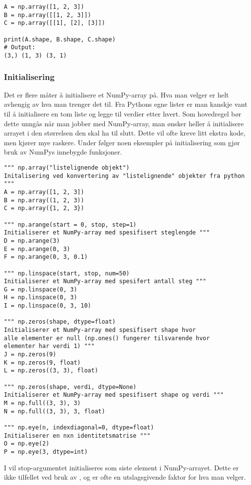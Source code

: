 \documentclass[a4paper,12pt]{article}
\begin{document}
\begin{lstlisting}
A = np.array([1, 2, 3])
B = np.array([[1, 2, 3]])
C = np.array([[1], [2], [3]])

print(A.shape, B.shape, C.shape)
# Output:
(3,) (1, 3) (3, 1)
\end{lstlisting}

\subsubsection{Initialisering}
Det er flere måter å initialisere et NumPy-array på. Hva man velger er helt avhengig av hva man trenger det til. Fra Pythons egne lister er man kanskje vant til å initialisere en tom liste og legge til verdier etter hvert. Som hovedregel bør dette unngås når man jobber med NumPy-array, man ønsker heller å initialisere arrayet i den størrelsen den skal ha til slutt. Dette vil ofte kreve litt ekstra kode, men kjører mye raskere. Under følger noen eksempler på initialisering som gjør bruk av NumPys innebygde funksjoner.

\begin{lstlisting}
""" np.array("listelignende objekt")
Initalisering ved konvertering av "listelignende" objekter fra python """
A = np.array([1, 2, 3])
B = np.array((1, 2, 3))
C = np.array({1, 2, 3})

""" np.arange(start = 0, stop, step=1)
Initialiserer et NumPy-array med spesifisert steglengde """
D = np.arange(3)
E = np.arange(0, 3)
F = np.arange(0, 3, 0.1)

""" np.linspace(start, stop, num=50)
Initialiserer et NumPy-array med spesifert antall steg """
G = np.linspace(0, 3)
H = np.linspace(0, 3)
I = np.linspace(0, 3, 10)

""" np.zeros(shape, dtype=float)
Initialiserer et NumPy-array med spesifisert shape hvor
alle elementer er null (np.ones() fungerer tilsvarende hvor
elementer har verdi 1) """
J = np.zeros(9)
K = np.zeros(9, float)
L = np.zeros((3, 3), float)

""" np.zeros(shape, verdi, dtype=None)
Initialiserer et NumPy-array med spesifisert shape og verdi """ 
M = np.full((3, 3), 3)
N = np.full((3, 3), 3, float)

""" np.eye(n, indexdiagonal=0, dtype=float)
Initialiserer en nxn identitetsmatrise """
O = np.eye(2)
P = np.eye(3, dtype=int)
\end{lstlisting}

\begin{mdframed}[frametitle={np.arange() vs np.linspace()}]
I  vil stop-argumentet initialiseres som siste element i NumPy-arrayet. Dette er ikke tilfellet ved bruk av , og er ofte en utslagsgivende faktor for hva man velger. 
\end{mdframed}
\end{document}
